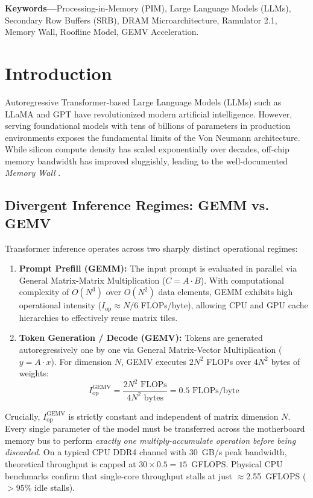 \documentclass[10pt,twocolumn]{article}
\begin{document}
\vspace{0.2em}
\noindent \textbf{\footnotesize Keywords---}Processing-in-Memory (PIM), Large Language Models (LLMs), Secondary Row Buffers (SRB), DRAM Microarchitecture, Ramulator 2.1, Memory Wall, Roofline Model, GEMV Acceleration.

\section{Introduction}
\label{sec:intro}
Autoregressive Transformer-based Large Language Models (LLMs) such as LLaMA \cite{touvron2023llama} and GPT \cite{brown2020language} have revolutionized modern artificial intelligence. However, serving foundational models with tens of billions of parameters in production environments exposes the fundamental limits of the Von Neumann architecture. While silicon compute density has scaled exponentially over decades, off-chip memory bandwidth has improved sluggishly, leading to the well-documented \textit{Memory Wall} \cite{mutlu2019processing}.

\subsection{Divergent Inference Regimes: GEMM vs. GEMV}
Transformer inference operates across two sharply distinct operational regimes:
\begin{enumerate}
    \item \textbf{Prompt Prefill (GEMM):} The input prompt is evaluated in parallel via General Matrix-Matrix Multiplication ($C = A \cdot B$). With computational complexity of $O(N^3)$ over $O(N^2)$ data elements, GEMM exhibits high operational intensity ($I_{\text{op}} \approx N/6$ FLOPs/byte), allowing CPU and GPU cache hierarchies to effectively reuse matrix tiles.
    \item \textbf{Token Generation / Decode (GEMV):} Tokens are generated autoregressively one by one via General Matrix-Vector Multiplication ($y = A \cdot x$). For dimension $N$, GEMV executes $2N^2$ FLOPs over $4N^2$ bytes of weights:
    \begin{equation}
        I_{\text{op}}^{\text{GEMV}} = \frac{2N^2 \text{ FLOPs}}{4N^2 \text{ bytes}} = 0.5 \text{ FLOPs/byte}
    \end{equation}
\end{enumerate}
Crucially, $I_{\text{op}}^{\text{GEMV}}$ is strictly constant and independent of matrix dimension $N$. Every single parameter of the model must be transferred across the motherboard memory bus to perform \textit{exactly one multiply-accumulate operation before being discarded}. On a typical CPU DDR4 channel with 30~GB/s peak bandwidth, theoretical throughput is capped at $30 \times 0.5 = 15$~GFLOPS. Physical CPU benchmarks confirm that single-core throughput stalls at just $\approx$2.55~GFLOPS ($>95\%$ idle stalls).
\end{document}
